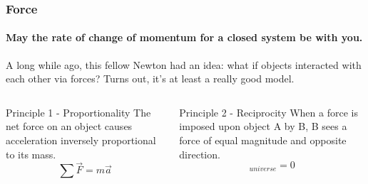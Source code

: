 \documentclass{beamer}%
\begin{document}
\begin{frame}
\frametitle{Force}
\framesubtitle{May the rate of change of momentum for a closed system be with you.}

A long while ago, this fellow Newton had an idea: what if objects interacted with each other via forces?
Turns out, it's at least a really good model.

\begin{columns}
\begin{block}{Principle 1 - Proportionality}
	The net force on an object causes acceleration inversely proportional to its mass.
	\begin{equation}
		\sum \vec{F} = m \vec{a}
	\end{equation}
\end{block}

\begin{block}{Principle 2 - Reciprocity}
	When a force is imposed upon object A by B, B sees a force of equal magnitude and opposite direction.
	\begin{equation}
		[\sum \vec{F}]_{universe} = 0
	\end{equation}
\end{block}

\end{columns}

\end{frame}
\end{document}
